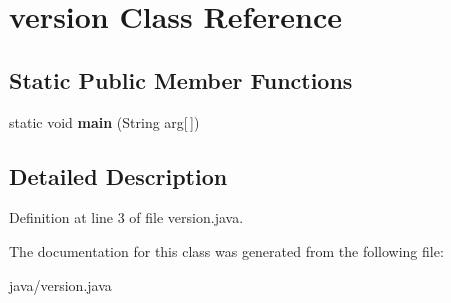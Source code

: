 \section{version Class Reference}
\label{classorg_1_1smallfoot_1_1transfer_1_1version}
\subsection*{Static Public Member Functions}
\begin{DoxyCompactItemize}
\item 
static void {\bfseries main} (String arg[$\,$])\label{classorg_1_1smallfoot_1_1transfer_1_1version_ae4faf7ff4190d227357ef851490d7757}

\end{DoxyCompactItemize}


\subsection{Detailed Description}


Definition at line 3 of file version.\-java.



The documentation for this class was generated from the following file\-:\begin{DoxyCompactItemize}
\item 
java/version.\-java\end{DoxyCompactItemize}
